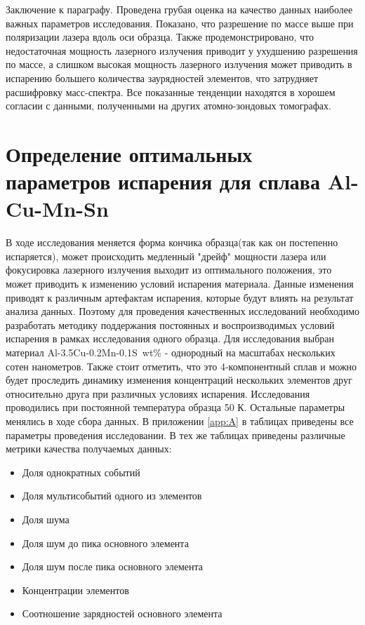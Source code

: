 \FloatBarrier
Заключение к параграфу. Проведена грубая оценка на качество данных наиболее важных параметров исследования. Показано, что разрешение по массе выше при поляризации лазера вдоль оси образца. Также продемонстрировано, что недостаточная мощность лазерного излучения приводит у ухудшению разрешения по массе, а слишком высокая мощность лазерного излучения может приводить в испарению большего количества заурядностей элементов, что затрудняет расшифровку масс-спектра. Все показанные тенденции находятся в хорошем согласии с данными, полученными на других атомно-зондовых томографах.

\section{Определение оптимальных параметров испарения для сплава Al-Cu-Mn-Sn}\label{sec:ch3/sect3}

В ходе исследования меняется форма кончика образца(так как он постепенно испаряется), может происходить медленный "дрейф" мощности лазера или фокусировка лазерного излучения выходит из оптимального положения, это может приводить к изменению условий испарения материала. Данные изменения приводят к различным артефактам испарения, которые будут влиять на результат анализа данных. Поэтому для проведения качественных исследований необходимо разработать методику поддержания постоянных и воспроизводимых условий испарения в рамках исследования одного образца.
Для исследования выбран материал Al-3.5Cu-0.2Mn-0.1S~wt\% - однородный на масштабах нескольких сотен нанометров. Также стоит отметить, что это 4-компонентный сплав и можно будет проследить динамику изменения концентраций нескольких элементов друг относительно друга при различных условиях испарения.
Исследования проводились при постоянной температура образца 50 К. Остальные параметры менялись в ходе сбора данных. В приложении \cref{app:A} в таблицах приведены все параметры проведения исследовании. В тех же таблицах приведены различные метрики качества получаемых данных: 

\begin{itemize}	
	\item Доля однократных событий
	\item Доля мультисобытий одного из элементов
	\item Доля шума
	\item Доля шум до пика основного элемента
	\item Доля шум после пика основного элемента
	\item Концентрации элементов
	\item Соотношение зарядностей основного элемента			
\end{itemize}


